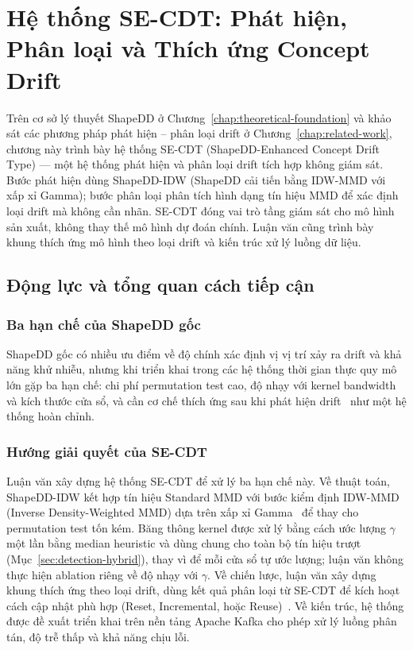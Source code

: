 \chapter{Hệ thống SE-CDT: Phát hiện, Phân loại và Thích ứng Concept Drift}
\label{chap:proposed-model}

Trên cơ sở lý thuyết ShapeDD ở Chương~\ref{chap:theoretical-foundation} và khảo sát các phương pháp phát hiện -- phân loại drift ở Chương~\ref{chap:related-work}, chương này trình bày hệ thống SE-CDT (ShapeDD-Enhanced Concept Drift Type) --- một hệ thống phát hiện và phân loại drift tích hợp không giám sát. Bước phát hiện dùng ShapeDD-IDW (ShapeDD cải tiến bằng IDW-MMD với xấp xỉ Gamma); bước phân loại phân tích hình dạng tín hiệu MMD để xác định loại drift mà không cần nhãn. SE-CDT đóng vai trò tầng giám sát cho mô hình sản xuất, không thay thế mô hình dự đoán chính. Luận văn cũng trình bày khung thích ứng mô hình theo loại drift và kiến trúc xử lý luồng dữ liệu.

\section{Động lực và tổng quan cách tiếp cận}

\subsection{Ba hạn chế của ShapeDD gốc}

ShapeDD gốc có nhiều ưu điểm về độ chính xác định vị vị trí xảy ra drift và khả năng khử nhiễu, nhưng khi triển khai trong các hệ thống thời gian thực quy mô lớn gặp ba hạn chế: chi phí permutation test cao, độ nhạy với kernel bandwidth và kích thước cửa sổ, và cần cơ chế thích ứng sau khi phát hiện drift~\cite{yuan2022advances} như một hệ thống hoàn chỉnh.

\subsection{Hướng giải quyết của SE-CDT}

Luận văn xây dựng hệ thống SE-CDT để xử lý ba hạn chế này. Về thuật toán, ShapeDD-IDW kết hợp tín hiệu Standard MMD với bước kiểm định IDW-MMD (Inverse Density-Weighted MMD) dựa trên xấp xỉ Gamma~\cite{gretton2009gamma} để thay cho permutation test tốn kém. Băng thông kernel được xử lý bằng cách ước lượng $\gamma$ một lần bằng median heuristic và dùng chung cho toàn bộ tín hiệu trượt (Mục~\ref{sec:detection-hybrid}), thay vì để mỗi cửa sổ tự ước lượng; luận văn không thực hiện ablation riêng về độ nhạy với $\gamma$. Về chiến lược, luận văn xây dựng khung thích ứng theo loại drift, dùng kết quả phân loại từ SE-CDT để kích hoạt cách cập nhật phù hợp (Reset, Incremental, hoặc Reuse)~\cite{gama2014survey, lu2018learning}. Về kiến trúc, hệ thống được đề xuất triển khai trên nền tảng Apache Kafka cho phép xử lý luồng phân tán, độ trễ thấp và khả năng chịu lỗi.

